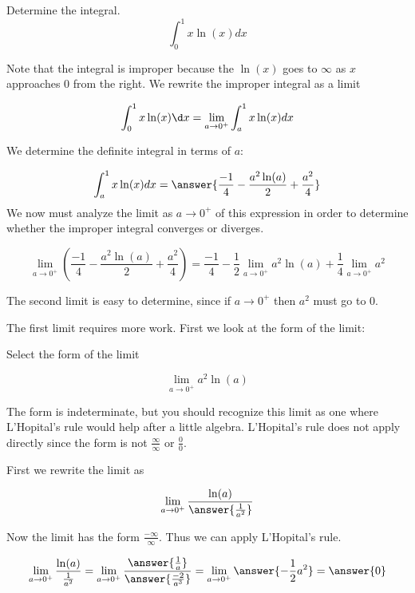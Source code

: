 \documentclass{ximera}
\author{Jason Miller}
\begin{document}
\begin{exercise}
Determine the integral.
\[
\int_0^1 x \ln(x) dx 
\]

Note that the integral is improper because the $\ln(x)$ goes to $\infty$ as $x$ approaches $0$ from the right. 
We  rewrite the improper integral as a limit

\[
\int_{0}^{1} x\ln(x) \d x=\lim_{a \to 0^+} \int_{a}^{1} x\ln(x) dx 
\]

We determine the definite integral in terms of $a$:

\[
\int_{a}^{1} x\ln(x) dx= \answer{\frac{-1}{4} -\frac{a^{2}\ln(a)}{2}+\frac{a^{2}}{4} }
\]
We now must analyze the limit as $a \to 0^+$ of this expression in order to determine whether the improper integral converges or diverges. 

\[
\lim_{a \to 0^+} \left( \frac{-1}{4} -\frac{a^{2}\ln(a)}{2}+\frac{a^{2}}{4} \right) = \frac{-1}{4} -\frac{1}{2}\lim_{a \to 0^+} a^{2} \ln(a) + \frac{1}{4} \lim_{a \to 0^+} a^{2}
\]

The second limit is easy to determine, since if $a \to 0^+$ then $a^2$ must go to $0$. 

The first limit requires more work. First we look at the form of the limit: 

\begin{exercise}
Select the form of the limit 

\[
\lim_{a \to 0^+} a^{2} \ln(a)
\] 

\begin{multipleChoice}
\choice{$0 \cdot \infty$}
\choice[correct]{$0\cdot -\infty$}
\choice{$\infty$}
\end{multipleChoice}

\begin{exercise}

The form is indeterminate, but you should recognize this limit as one where  L'Hopital's rule would help after a little algebra.  L'Hopital's rule does not apply directly since the form is not $\frac{\infty}{\infty}$ or $\frac{0}{0}$. 

First we rewrite the limit as

\[
\lim_{a \to 0^+} \frac{\ln(a)}{\answer{\frac{1}{a^2}}}
\]

\begin{exercise}
Now the limit has the form $\frac{-\infty}{\infty}$. Thus we can apply L'Hopital's rule. 

\[
\lim_{a \to 0^+} \frac{\ln(a)}{\frac{1}{a^2}} =\lim_{a \to 0^+} \frac{\answer{ \frac{1}{a}}}{\answer{\frac{-2}{a^3}}}=
\lim_{a \to 0^+} \answer{ -\frac{1}{2}a^2 }=\answer{0}
\]


\end{exercise}
\end{exercise}
\end{exercise}
\end{exercise}
\end{document}
